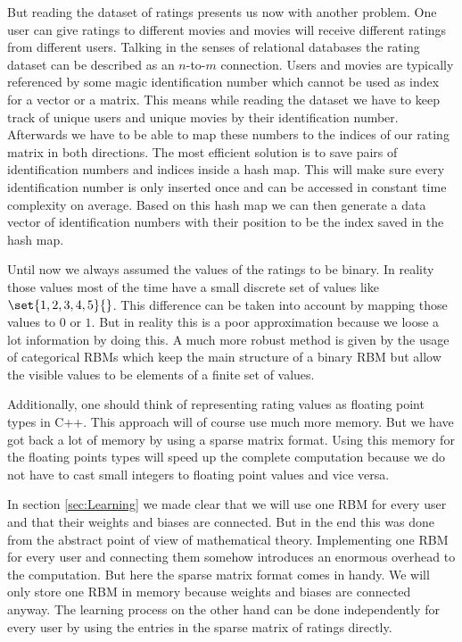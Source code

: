 \documentclass[crop=false,10pt]{standalone}
\begin{document}
    But reading the dataset of ratings presents us now with another problem.
    One user can give ratings to different movies and movies will receive different ratings from different users.
    Talking in the senses of relational databases the rating dataset can be described as an $n$-to-$m$ connection.
    Users and movies are typically referenced by some magic identification number which cannot be used as index for a vector or a matrix.
    This means while reading the dataset we have to keep track of unique users and unique movies by their identification number.
    Afterwards we have to be able to map these numbers to the indices of our rating matrix in both directions.
    The most efficient solution is to save pairs of identification numbers and indices inside a hash map.
    This will make sure every identification number is only inserted once and can be accessed in constant time complexity on average.
    Based on this hash map we can then generate a data vector of identification numbers with their position to be the index saved in the hash map.

    Until now we always assumed the values of the ratings to be binary.
    In reality those values most of the time have a small discrete set of values like $\set{1,2,3,4,5}{}$.
    This difference can be taken into account by mapping those values to $0$ or $1$.
    But in reality this is a poor approximation because we loose a lot information by doing this.
    A much more robust method is given by the usage of categorical RBMs which keep the main structure of a binary RBM but allow the visible values to be elements of a finite set of values.
    \cite{Hinton2007,Hinton2010,Murphy2012,towardsdatascience}

    Additionally, one should think of representing rating values as floating point types in C++.
    This approach will of course use much more memory.
    But we have got back a lot of memory by using a sparse matrix format.
    Using this memory for the floating points types will speed up the complete computation because we do not have to cast small integers to floating point values and vice versa.

    In section \ref{sec:Learning} we made clear that we will use one RBM for every user and that their weights and biases are connected.
    But in the end this was done from the abstract point of view of mathematical theory.
    Implementing one RBM for every user and connecting them somehow introduces an enormous overhead to the computation.
    But here the sparse matrix format comes in handy.
    We will only store one RBM in memory because weights and biases are connected anyway.
    The learning process on the other hand can be done independently for every user by using the entries in the sparse matrix of ratings directly.
\end{document}
